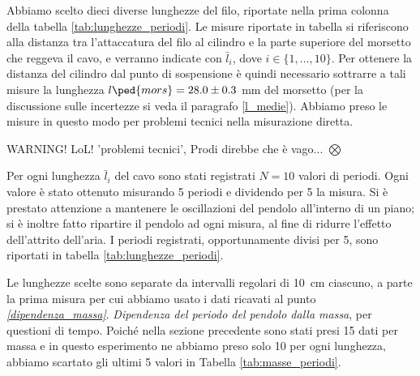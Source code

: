 Abbiamo scelto dieci diverse lunghezze del filo, riportate nella prima colonna della tabella \ref{tab:lunghezze_periodi}.
Le misure riportate in tabella si riferiscono alla distanza tra l'attaccatura del filo al cilindro e la parte superiore
del morsetto che reggeva il cavo, e verranno indicate con $\bar{l}_i$, dove $i \in \{1, \dots, 10\}$.
Per ottenere la distanza del cilindro dal punto di sospensione è quindi necessario sottrarre a tali misure
la lunghezza $l\ped{mors} = 28.0 \pm 0.3$ mm del morsetto (per la discussione sulle incertezze si veda il paragrafo
\ref{l_medie}). Abbiamo preso le misure in questo modo per problemi tecnici nella misurazione diretta.

WARNING! LoL! 'problemi tecnici', Prodi direbbe che è vago... $\bigotimes$

Per ogni lunghezza $\bar{l}_i$ del cavo sono stati registrati $N = 10$ valori di periodi. Ogni valore è stato ottenuto
misurando 5 periodi e dividendo per 5 la misura. Si è prestato attenzione a mantenere le oscillazioni del pendolo
all'interno di un piano; si è inoltre fatto ripartire il pendolo ad ogni misura, al fine di ridurre l'effetto dell'attrito
dell'aria. I periodi registrati, opportunamente divisi per 5, sono riportati in tabella \ref{tab:lunghezze_periodi}.

Le lunghezze scelte sono separate da intervalli regolari di \SI{10}{\centi\metre} ciascuno, a parte la prima
misura per cui abbiamo usato i dati ricavati al punto \emph{\ref{dipendenza_massa}}$.$ \emph{Dipendenza del periodo del pendolo dalla massa}, per questioni di tempo.
Poiché nella sezione precedente sono stati presi 15 dati per massa e in questo esperimento ne abbiamo preso solo 10
per ogni lunghezza, abbiamo scartato gli ultimi 5 valori in Tabella \ref{tab:masse_periodi}.

